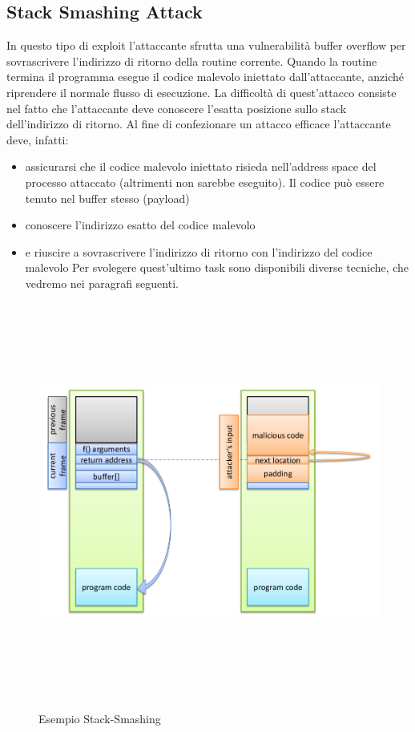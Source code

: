 \subsection{Stack Smashing Attack}
In questo tipo di exploit l'attaccante sfrutta una vulnerabilità buffer overflow per sovrascrivere l'indirizzo di ritorno della routine corrente. Quando la routine termina il programma esegue il codice malevolo iniettato dall’attaccante, anziché riprendere il normale flusso di esecuzione. La difficoltà di quest'attacco consiste nel fatto che l'attaccante deve conoscere l'esatta posizione sullo stack dell'indirizzo di ritorno. Al fine di confezionare un attacco efficace l'attaccante deve, infatti:
\begin{itemize}
  \item assicurarsi che il codice malevolo iniettato risieda nell'address space del processo attaccato (altrimenti non sarebbe eseguito). Il codice può essere tenuto nel buffer stesso (payload)
  \item conoscere l’indirizzo esatto del codice malevolo
  \item e riuscire a sovrascrivere l’indirizzo di ritorno con l'indirizzo del codice malevolo
Per svolegere quest'ultimo task sono disponibili diverse tecniche, che vedremo nei paragrafi seguenti.
\end{itemize}
\begin{figure}[htbp]
	\centering%
	\subfigure%
	{\includegraphics[height=13cm, width=13cm, keepaspectratio]{Immagini/sistemi_operativi/stack_smash.png}}
	\caption{Esempio Stack-Smashing\label{fig:stack_smash}} 	
\end{figure}
